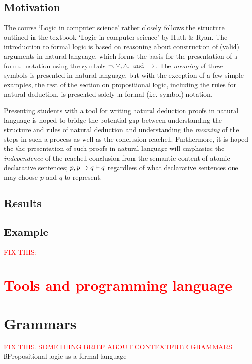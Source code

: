\documentclass[a4paper]{article}
\newcommand{\FIX}[1]{\textcolor{Red}{FIX THIS: #1}}
\begin{document}
\subsection{Motivation}
    The course `Logic in computer science' rather closely follows the 
    structure outlined in the textbook `Logic in computer science' by
    Huth \& Ryan\cite{hr}. The introduction to formal logic is based on
    reasoning about construction of (valid) arguments in natural 
    language\cite[pp.~1-2]{hr}, which forms the basis for the presentation
    of a formal notation using the symbols 
    \(\neg, \lor, \land, \textnormal{ and } \rightarrow\)\cite[p.~4]{hr}. 
    The \emph{meaning} of these symbols is presented in natural language,
    but with the exception of a few simple examples, the rest of the section 
    on propositional logic, including the rules for natural deduction,
    is presented solely in formal (i.e. symbol) notation.

    Presenting students with a tool for writing natural deduction proofs
    in natural language is hoped to bridge the potential gap between
    understanding the structure and rules of natural deduction and
    understanding the \emph{meaning} of the steps in such a process as well
    as the conclusion reached. Furthermore, it is hoped the the
    presentation of such proofs in natural language will emphasize the
    \emph{independence} of the reached conclusion from the semantic 
    content of atomic declarative sentences; \(p, p \rightarrow q \vdash q\)
    regardless
    of what declarative sentences one may choose $p$ and $q$ to represent.

\subsection{Results}

\subsection{Example}

\FIX{\section{Tools and programming language}} %

\newpage

\section{Grammars}
\FIX{SOMETHING BRIEF ABOUT CONTEXTFREE GRAMMARS}
\ss{Propositional logic as a formal language}

\end{document}
